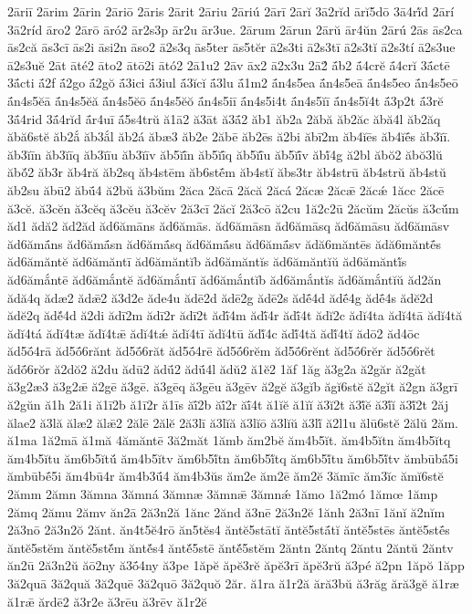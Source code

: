 {2āriī
2ārim
2ārin
2āriō
2āris
2ārit
2āriu
2āriú
2ārī
2ārĭ
3ā2rĭd
ārĭ5dō
3ā4rĭ́d
2ārí
3ā2ríd
āro2
2ārō
āró2
ār2s3p
ār2u
ār3ue.
2ārum
2ārun
2ārŭ
ār4ŭn
2ārú
2ās
ās2ca
ās2că
ās3cī
ās2i
āsi2n
āso2
ā2s3q
ās5ter
ās5tĕr
ā2s3ti
ā2s3tī
ā2s3tĭ
ā2s3tí
ā2s3ue
ā2s3uĕ
2āt
āté2
āto2
ātō2i
ātó2
2ā1u2
2āv
āx2
ā2x3u
2ā2́
ā́b2
ā́4crĕ
ā́4crĭ
3ā́ctē
3ā́cti
ā́2f
ā́2go
ā́2gŏ
ā́3ici
ā́3iul
ā́3ĭcĭ
ā́3lu
ā́1m2
ā́n4s5ea
ā́n4s5eā
ā́n4s5eo
ā́n4s5eō
ā́n4s5ĕā
ā́n4s5ĕă
ā́n4s5ĕō
ā́n4s5ĕŏ
ā́n4s5iī
ā́n4s5i4t
ā́n4s5ĭī
ā́n4s5ĭ4t
ā́3p2t
ā́3rĕ
3ā́4rid
3ā́4rĭd
ā́r4uī
ā́5s4trŭ
ă1ā2
ă3āt
ă3ā́2
ăb1
ăb2a
2ăbă
ăb2ăc
ăbă4l
ăb2ăq
ăbă6stĕ
ăb2ắ
ăb3ắl
ăb2á
ăbæ3
ăb2e
2ăbē
ăb2ēs
ă2bi
ăbī2m
ăb4ĭēs
ăb4ĭḗs
ăb3ĭī.
ăb3ĭīn
ăb3ĭīq
ăb3ĭīu
ăb3ĭīv
ăb5ĭī́n
ăb5ĭī́q
ăb5ĭī́u
ăb5ĭī́v
ăbĭ́4g
ă2bl
ăbŏ2
ăbŏ3lŭ
ăbŏ́2
ăb3r
ăb4ră
ăb2sq
ăb4stēm
ăb6stḗm
ăb4stĭ
ăbs3tr
ăb4strū
ăb4strŭ
ăb4stŭ
ăb2su
ăbū2
ăbū́4
ă2bŭ
ă3bŭm
2ăca
2ăcā
2ăcă
2ăcá
2ăcæ
2ăcǣ
2ăcǽ
1ăcc
2ăcē
ă3cĕ.
ă3cĕn
ă3cĕq
ă3cĕu
ă3cĕv
2ă3cī
2ăcĭ
2ă3cō
ă2cu
1ă2c2ū
2ăcŭm
2ăcŭs
ă3cŭ́m
ăd1
ădă2
ăd2ăd
ăd6ămāns
ăd6ămās.
ăd6ămāsn
ăd6ămāsq
ăd6ămāsu
ăd6ămāsv
ăd6ămā́ns
ăd6ămā́sn
ăd6ămā́sq
ăd6ămā́su
ăd6ămā́sv
ădă6măntēs
ădă6măntḗs
ăd6ămăntĕ
ăd6ămăntī
ăd6ămăntĭb
ăd6ămăntĭs
ăd6ămăntĭŭ
ăd6ămăntĭ́s
ăd6ămắntē
ăd6ămắntĕ
ăd6ămắntī
ăd6ămắntĭb
ăd6ămắntĭs
ăd6ămắntĭŭ
ăd2ăn
ădă4q
ădæ2
ădǣ2
ă3d2e
ăde4u
ădē2d
ădē2g
ădē2s
ădḗ4d
ădḗ4g
ădḗ4s
ădĕ2d
ădĕ2q
ădĕ́4d
ă2di
ădī2m
ădī2r
ădī2t
ădī́4m
ădī́4r
ădī́4t
ădĭ2c
ădĭ4ta
ădĭ4tā
ădĭ4tă
ădĭ4tá
ădĭ4tæ
ădĭ4tǣ
ădĭ4tǽ
ădĭ4tī
ădĭ4tū
ădĭ́4c
ădĭ́4tă
ădĭ́4tĭ
ădō2
ăd4ōc
ăd5ṓ4rā
ăd5ṓ6rănt
ăd5ṓ6răt
ăd5ṓ4rē
ăd5ṓ6rĕm
ăd5ṓ6rĕnt
ăd5ṓ6rĕr
ăd5ṓ6rĕt
ădṓ6rŏr
ă2dŏ2
ă2du
ădū2
ădū́2
ădū́4l
ădŭ2
ă1ĕ2
1ăf
1ăg
ă3g2a
ă2găr
ă2găt
ă3g2æ3
ă3g2ǣ
ă2gē
ă3gē.
ă3gēq
ă3gēu
ă3gēv
ă2gĕ
ă3gĭb
ăgĭ6stĕ
ă2gĭt
ă2gn
ă3grī
ă2gŭn
ă1h
2ă1i
ă1ī2b
ă1ī2r
ă1īs
ăī́2b
ăī́2r
ăī́4t
ă1ĭĕ
ă1ĭĭ
ă3ĭ2t
ă3ĭ́ĕ
ă3ĭ́ĭ
ă3ĭ́2t
2ăj
ălae2
ă3lă
ălæ2
ălǣ2
2ălē
2ălĕ
2ă3lī
ă3lĭă
ă3lĭō
ă3lĭŭ
ă3lĭ́
ă2l1u
ălū6stĕ
2ălŭ
2ăm.
ă1ma
1ă2mā
ă1mă
4ămăntē
3ă2măt
1ămb
ăm2bĕ
ăm4b5ĭt.
ăm4b5ĭtn
ăm4b5ĭtq
ăm4b5ĭtu
ăm6b5ĭtŭ́
ăm4b5ĭtv
ăm6b5ĭ́tn
ăm6b5ĭ́tq
ăm6b5ĭ́tu
ăm6b5ĭ́tv
ămbūbā́5i
ămbūbḗ5i
ăm4bū4r
ăm4b3ū́4
ăm4b3ŭs
ăm2e
ăm2ē
ăm2ĕ
3ămīc
ăm3ĭc
ămĭ6stĕ
2ămm
2ămn
3ămna
3ămná
3ămnæ
3ămnǣ
3ămnǽ
1ămo
1ă2mó
1ămœ
1ămp
2ămq
2ămu
2ămv
ăn2ā
2ă3n2ă
1ănc
2ănd
ă3nē
2ă3n2ĕ
1ănh
2ă3nī
1ănĭ
ă2nĭm
2ă3nō
2ă3n2ŏ
2ănt.
ăn4t5ĕ4rō
ăn5tĕs4
ăntĕ5stātĭ
ăntĕ5stā́tĭ
ăntĕ5stēs
ăntĕ5stḗs
ăntĕ5stĕm
ăntĕ5stĕ́m
ăntĕ́s4
ăntĕ́5stē
ăntĕ́5stĕm
2ăntn
2ăntq
2ăntu
2ăntŭ
2ăntv
ăn2ū
2ă3n2ŭ
ăō2ny
ă3ṓ4ny
ă3pe
1ăpĕ
ăpĕ3rĕ
ăpĕ3rī
ăpĕ3rŭ
ă3pé
ă2pn
1ăpŏ
1ăpp
3ă2quā
3ă2quă
3ă2quē
3ă2quō
3ă2quŏ
2ăr.
ă1ra
ă1r2ă
ără3bŭ
ă3răg
ără3gĕ
ă1ræ
ă1rǣ
ărdē2
ă3r2e
ă3rēu
ă3rēv
ă1r2ĕ
}
